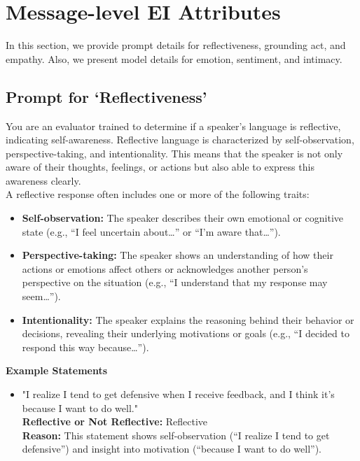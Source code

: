 \section{Message-level EI Attributes}
In this section, we provide prompt details for reflectiveness, grounding act, and empathy.
Also, we present model details for emotion, sentiment, and intimacy.


\subsection{Prompt for `Reflectiveness'}
\label{appendix:evaluation-reflective}

\begin{tcolorbox}[title=Reflectiveness Classification, myboxstyle, breakable]
You are an evaluator trained to determine if a speaker’s language is reflective, indicating self-awareness. Reflective language is characterized by self-observation, perspective-taking, and intentionality. This means that the speaker is not only aware of their thoughts, feelings, or actions but also able to express this awareness clearly. \\

A reflective response often includes one or more of the following traits:

\begin{itemize}
    \item \textbf{Self-observation:} The speaker describes their own emotional or cognitive state (e.g., “I feel uncertain about…” or “I’m aware that…”).
    \item \textbf{Perspective-taking:} The speaker shows an understanding of how their actions or emotions affect others or acknowledges another person’s perspective on the situation (e.g., “I understand that my response may seem…”).
    \item \textbf{Intentionality:} The speaker explains the reasoning behind their behavior or decisions, revealing their underlying motivations or goals (e.g., “I decided to respond this way because…”).
\end{itemize}

\textbf{Example Statements}
\begin{itemize} 
    \item "I realize I tend to get defensive when I receive feedback, and I think it’s because I want to do well."  \\
    \textbf{Reflective or Not Reflective:} Reflective  \\
    \textbf{Reason:} This statement shows self-observation (“I realize I tend to get defensive”) and insight into motivation (“because I want to do well”).


\end{itemize}
\end{tcolorbox}
